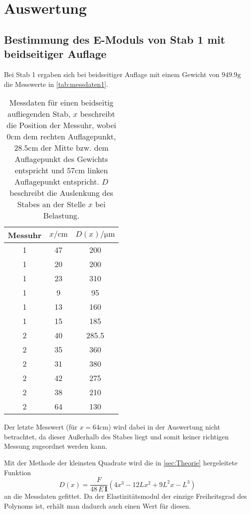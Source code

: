 \section{Auswertung}
\label{sec:Auswertung}

\subsection{Bestimmung des E-Moduls von Stab 1 mit beidseitiger Auflage}
\label{sec:messung1}
Bei Stab 1 ergaben sich bei beidseitiger Auflage mit einem Gewicht von $949.9 \si{\gram}$ 
die Messwerte in \autoref{tab:messdaten1}.

\begin{table}
	\centering
	\caption{Messdaten für einen beidseitig aufliegenden Stab, $x$ beschreibt
	die Position der Messuhr, wobei $0\si{\centi\meter}$
	dem rechten Auflagepunkt, $28.5\si{\centi\meter}$ der Mitte bzw. dem Auflagepunkt 
	des Gewichts entspricht und $57\si{\centi\meter}$ linken Auflagepunkt entspricht.
	$D$ beschreibt die Auslenkung des Stabes an der Stelle $x$ bei Belastung.}
	\label{tab:messdaten1}
	\begin{tabular}{c c c}
	\toprule
	Messuhr &
	$x / \si{\centi\meter}$ &
	$D(x) / \si{\micro\meter}$
	\\
	\midrule
	1 & 47 & 200 \\
	1 & 20 & 200 \\
	1 & 23 & 310 \\
	1 & 9 & 95 \\
	1 & 13 & 160 \\
	1 & 15 & 185 \\
	2 & 40 & 285.5 \\
	2 & 35 & 360 \\
	2 & 31 & 380 \\
	2 & 42 & 275 \\
	2 & 38 & 210 \\
	2 & 64 & 130 \\
	\bottomrule
\end{tabular}
\end{table}

Der letzte Messwert (für $x = 64\si{\centi\meter}$) wird dabei in der Auswertung nicht
betrachtet, da dieser Außerhalb des Stabes liegt und somit keiner richtigen Messung 
zugeordnet werden kann.

Mit der Methode der kleinsten Quadrate wird die in \autoref{sec:Theorie} hergeleitete
Funktion 
\begin{equation}
	D(x) = \frac{F}{48 \, E \, \mathbf{I}} \left(4x^3 - 12Lx^2 + 9L^2x - L^3 \right)
\end{equation}
an die Messdaten gefittet. Da der Elastizitätsmodul der einzige
Freiheitsgrad des Polynoms ist, erhält man dadurch auch einen Wert für diesen.

